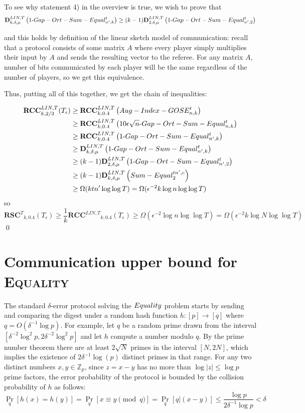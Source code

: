 \documentclass[11pt]{article}
\numberwithin{equation}{section}
\theoremstyle{definition}
\theoremstyle{plain}
\newcommand{\Z}{\mathbb Z}
\newcommand{\error}{\ensuremath{\delta}}
\newcommand{\bigo}[1]{\ensuremath{{{O} \left( {#1} \right)}}}
\newcommand{\rscT}{\ensuremath{\mathbf{RSC}^T}}
\newcommand{\rcclinT}{\ensuremath{\mathbf{RCC}^{LIN,T}}}
\newcommand{\DlinT}{\ensuremath{\mathbf{D}^{LIN,T}}}
\newcommand{\sumequal}{\textsc{Sum-Equal} }
\newcommand{\gose}{\textsc{Gap-Ort-Sum-Equal}}
\newcommand{\auggo}{\textsc{Aug-Index-GOSE}}
\begin{document}
	{\color{black} To see why statement 4) in the overview is true, we wish to prove that
	$$ \DlinT_{k,\delta,\mu}\left(1\text{-}\gose_{n',k}^t\right)\ge (k-1) \DlinT_{2,\delta,\mu}\left(1\text{-}\gose_{n',2}^t\right)$$
	
	and this holds by definition of the linear sketch model of communication: recall that a protocol consists of some matrix $A$ where every player simply multiplies their input by $A$ and sends the resulting vector to the referee. For any matrix $A$, number of bits communicated by each player will be the same regardless of the number of players, so we get this equivalence.} %
	
	Thus, {\color{black} putting all of this together, we get the chain of inequalities:}
	
	\begin{align*}
	\rcclinT_{k,2/3}(T_\epsilon) &\ge \rcclinT_{k,0.4}\left( \auggo_{n,k}^{t} \right)\\
	&\ge \rcclinT_{k,0.4}\left(10\epsilon\sqrt{n}\text{-}\gose_{n,k}^t\right)\\
	&\ge \rcclinT_{k,0.4}\left(1\text{-}\gose_{n',k}^t\right)\\
	&\ge \DlinT_{k,\delta,\mu}\left(1\text{-}\gose_{n',k}^t\right)\\
	&\ge (k-1) \DlinT_{2,\delta,\mu}\left(1\text{-}\gose_{n',2}^t\right)\\
	&\ge (k-1) \DlinT_{k,\delta,\mu}\left(\sumequal_{2}^{tn',c}\right)\\
	&\ge \Omega(ktn' \log \log T) = \Omega(\epsilon^{-2} k\log n \log \log T)
	\end{align*}
	so
	$$\rscT_{k,0.4}(T_\epsilon) \ge \frac{1}{k} \rcclinT_{k,0.4}(T_\epsilon) \ge \Omega(\epsilon^{-2} \log n \log \log T) = \Omega(\epsilon^{-2} k \log N \log \log T)$$
	\qed

\appendix

%


\section{Communication upper bound for \textsc{Equality}}
\label{sec:testing equality}


The standard $\error$-error protocol solving the $\textsc{Equality}$ problem starts by sending and comparing the digest under a random hash function $h:[p]\to [q]$ where $q=\bigo{\error^{-1}\log p}$. 
For example, let $q$ be a random prime drawn from the interval $[\error^{-2}\log^2 p, 2\error^{-2}\log^2 p]$ and let $h$ compute a number modulo $q$.
By the prime number theorem there are at least $2\sqrt{N}$ primes in the interval $[N,2N]$, 
which implies the existence of $2\error^{-1}\log(p)$ distinct primes in that range. 
%
For any two distinct numbers $x,y\in \Z_p$,  since $z=x-y$ has no more than $\log|z|\le \log p$ prime factors, the error probability of the protocol is bounded by the collision probability of $h$ as follows:
%
\[
\Pr_q\left[h(x)= h(y) \right]=\Pr_q\left[x\equiv y \pmod q \right]=\Pr_q\left[q | (x-y) \right] \le \frac{\log p}{2\error^{-1}\log p} <\error
\]
%
\end{document}
